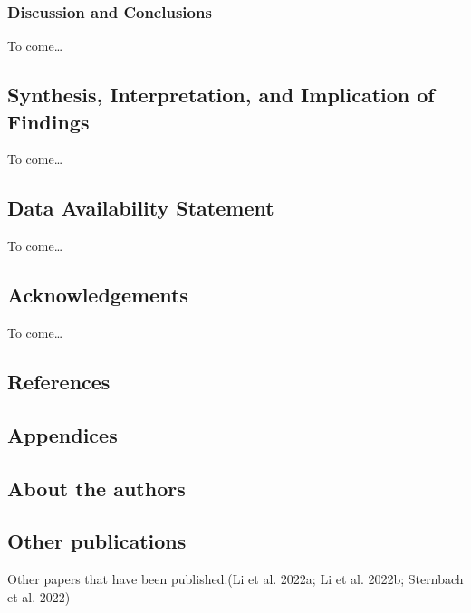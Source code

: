 \documentclass[
  letterpaper,
  DIV=11,
  numbers=noendperiod]{scrartcl}
\begin{document}
\subsubsection{Discussion and
Conclusions}\label{discussion-and-conclusions-2}

To come\ldots{}

\subsection{Synthesis, Interpretation, and Implication of
Findings}\label{synthesis-interpretation-and-implication-of-findings}

To come\ldots{}

\subsection{Data Availability
Statement}\label{data-availability-statement}

To come\ldots{}

\subsection{Acknowledgements}\label{acknowledgements}

To come\ldots{}

\subsection{References}\label{references}

\subsection{Appendices}\label{appendices}

\subsection{About the authors}\label{about-the-authors}

\subsection{Other publications}\label{other-publications}

Other papers that have been published.(Li et al. 2022a; Li et al. 2022b;
Sternbach et al. 2022)
\end{document}

